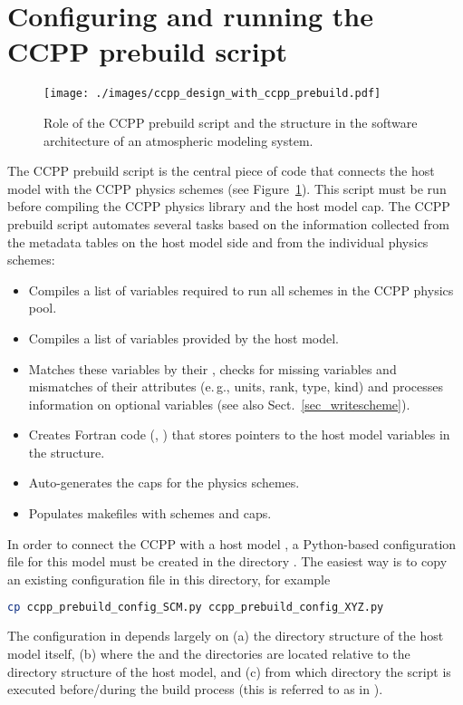 \section{Configuring and running the CCPP prebuild script}
\label{sec_ccpp_prebuild_config}
\begin{figure}
\centerline{\texttt{[image: ./images/ccpp\_design\_with\_ccpp\_prebuild.pdf]}}
\caption{Role of the CCPP prebuild script and the  structure in the software architecture of an atmospheric modeling system.}\label{fig_ccpp_design_with_ccpp_prebuild}
\end{figure}
The CCPP prebuild script  is the central piece of code that connects the host model with the CCPP physics schemes (see Figure~\ref{fig_ccpp_design_with_ccpp_prebuild}). This script must be run before compiling the CCPP physics library and the host model cap. The CCPP prebuild script automates several tasks based on the information collected from the metadata tables on the host model side and from the individual physics schemes:
\begin{itemize}
\item Compiles a list of variables required to run all schemes in the CCPP physics pool.
\item Compiles a list of variables provided by the host model.
\item Matches these variables by their , checks for missing variables and mismatches of their attributes (e.\,g., units, rank, type, kind) and processes information on optional variables (see also Sect.~\ref{sec_writescheme}).
\item Creates Fortran code (, ) that stores pointers to the host model variables in the  structure.
\item Auto-generates the caps for the physics schemes.
\item Populates makefiles with schemes and caps.
\end{itemize}

In order to connect the CCPP with a host model , a Python-based configuration file for this model must be created in the directory . The easiest way is to copy an existing configuration file in this directory, for example
\begin{lstlisting}[language=bash]
cp ccpp_prebuild_config_SCM.py ccpp_prebuild_config_XYZ.py
\end{lstlisting}
The configuration in  depends largely on (a) the directory structure of the host model itself, (b) where the  and the  directories are located relative to the directory structure of the host model, and (c) from which directory the  script is executed before/during the build process (this is referred to as  in ).

